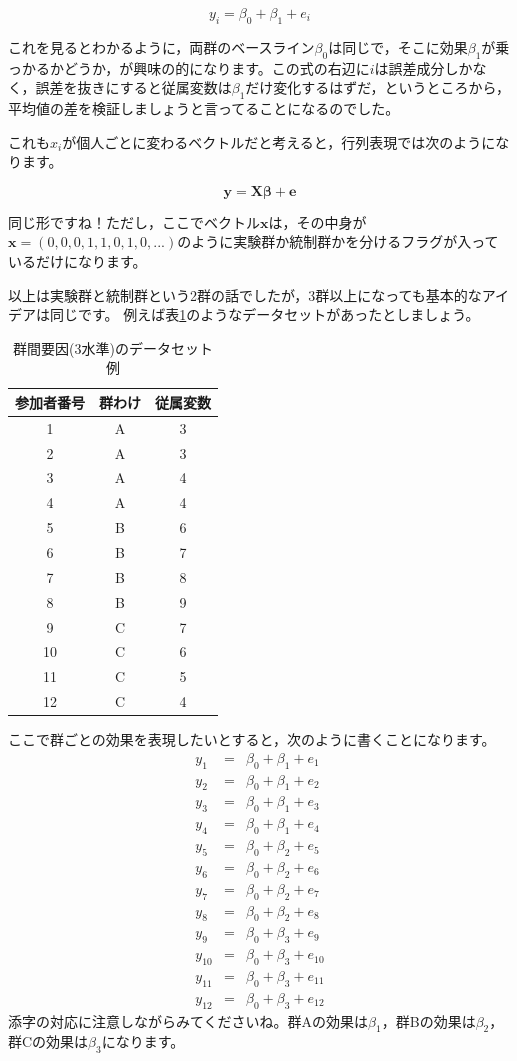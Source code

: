\documentclass{ltjsbook}
\begin{document}
\[ y_i = \beta_0 + \beta_1 + e_i \]

これを見るとわかるように，両群のベースライン$\beta_0$は同じで，そこに効果$\beta_1$が乗っかるかどうか，が興味の的になります。この式の右辺に$i$は誤差成分しかなく，誤差を抜きにすると従属変数は$\beta_1$だけ変化するはずだ，というところから，平均値の差を検証しましょうと言ってることになるのでした。

これも$x_i$が個人ごとに変わるベクトルだと考えると，行列表現では次のようになります。

\[ \bm{y} = \bm{X\beta} + \bm{e} \]

同じ形ですね！ただし，ここでベクトル$\bm{x}$は，その中身が$\bm{x} = ( 0,0,0,1,1,0,1,0,...)$のように実験群か統制群かを分けるフラグが入っているだけになります。

以上は実験群と統制群という2群の話でしたが，3群以上になっても基本的なアイデアは同じです。
例えば表\ref{tbl::07_01}のようなデータセットがあったとしましょう。
\begin{table}[ht]
	\centering
		\caption{群間要因(3水準)のデータセット例}
\begin{tabular}{ccc}
	参加者番号& 群わけ & 従属変数 \\\hline
1 & A & 3 \\
2 & A & 3 \\
3 & A & 4 \\
4 & A & 4 \\
5 & B & 6 \\
6 & B & 7 \\
7 & B & 8 \\
8 & B & 9 \\
9 & C & 7 \\
10 & C & 6 \\
11 & C & 5 \\
12 & C & 4 \\\hline
\end{tabular}
\label{tbl::07_01}
\end{table}

ここで群ごとの効果を表現したいとすると，次のように書くことになります。
\begin{eqnarray*}
	y_1 &=& \beta_0 + \beta_1 + e_1 \\
	y_2 &=& \beta_0 + \beta_1 + e_2 \\
	y_3 &=& \beta_0 + \beta_1 + e_3 \\
	y_4 &=& \beta_0 + \beta_1 + e_4 \\
	y_5 &=& \beta_0 + \beta_2 + e_5 \\
	y_6 &=& \beta_0 + \beta_2 + e_6 \\
	y_7 &=& \beta_0 + \beta_2 + e_7 \\
	y_8 &=& \beta_0 + \beta_2 + e_8 \\
	y_9 &=& \beta_0 + \beta_3 + e_9 \\
	y_{10} &=& \beta_0 + \beta_3 + e_{10} \\
	y_{11} &=& \beta_0 + \beta_3 + e_{11} \\
	y_{12} &=& \beta_0 + \beta_3 + e_{12} 
\end{eqnarray*}
添字の対応に注意しながらみてくださいね。群Aの効果は$\beta_1$，群Bの効果は$\beta_2$，群Cの効果は$\beta_3$になります。
\end{document}
